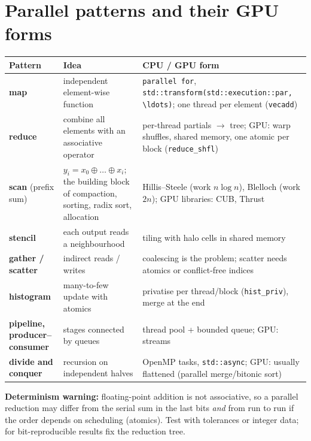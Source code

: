 \documentclass[10pt,a4paper,openany,oneside]{report}
\newcommand{\prio}[1]{\texorpdfstring{\ifcase#1\or{\color{gold}\ding{72}}\or{\color{gold}\ding{72}\ding{72}}\or{\color{gold}\ding{72}\ding{72}\ding{72}}\fi}{}}
\begin{document}
\section{Parallel patterns and their GPU forms \prio{2}}
\begin{center}\small
\begin{xltabular}{\textwidth}{@{}L{2.6cm}L{4.6cm}Y@{}}
\toprule
\textbf{Pattern} & \textbf{Idea} & \textbf{CPU / GPU form}\\
\midrule\endhead
\textbf{map} & independent element-wise function & \texttt{parallel for}, \texttt{std::transform(std::execution::par, \textbackslash{}ldots)}; one thread per element (\texttt{vecadd})\\
\textbf{reduce} & combine all elements with an associative operator & per-thread partials $\to$ tree; GPU: warp shuffles, shared memory, one atomic per block (\texttt{reduce\_shfl})\\
\textbf{scan} (prefix sum) & $y_i=x_0\oplus\dots\oplus x_i$; the building block of compaction, sorting, radix sort, allocation & Hillis--Steele (work $n\log n$), Blelloch (work $2n$); GPU libraries: CUB, Thrust\\
\textbf{stencil} & each output reads a neighbourhood & tiling with halo cells in shared memory\\
\textbf{gather / scatter} & indirect reads / writes & coalescing is the problem; scatter needs atomics or conflict-free indices\\
\textbf{histogram} & many-to-few update with atomics & privatise per thread/block (\texttt{hist\_priv}), merge at the end\\
\textbf{pipeline, producer--consumer} & stages connected by queues & thread pool + bounded queue; GPU: streams\\
\textbf{divide and conquer} & recursion on independent halves & OpenMP tasks, \texttt{std::async}; GPU: usually flattened (parallel merge/bitonic sort)\\
\bottomrule
\end{xltabular}
\end{center}
\textbf{Determinism warning:} floating-point addition is not associative, so a parallel reduction may differ from the serial sum in the last bits \emph{and} from run to run if the order depends on scheduling (atomics). Test with tolerances or integer data; for bit-reproducible results fix the reduction tree.
\end{document}
